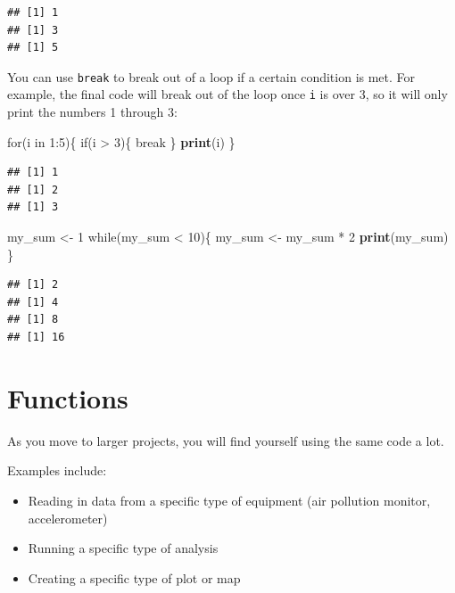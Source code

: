 \documentclass[]{book}
\makeatletter
\newenvironment{Shaded}{\begin{snugshade}}{\end{snugshade}}
\newcommand{\KeywordTok}[1]{\textcolor[rgb]{0.13,0.29,0.53}{\textbf{{#1}}}}
\newcommand{\DecValTok}[1]{\textcolor[rgb]{0.00,0.00,0.81}{{#1}}}
\newcommand{\StringTok}[1]{\textcolor[rgb]{0.31,0.60,0.02}{{#1}}}
\newcommand{\NormalTok}[1]{{#1}}
\providecommand{\tightlist}{%
  \setlength{\itemsep}{0pt}\setlength{\parskip}{0pt}}
\newenvironment{kframe}{%
\medskip{}
\setlength{\fboxsep}{.8em}
 \def\at@end@of@kframe{}%
 \ifinner\ifhmode%
  \def\at@end@of@kframe{\end{minipage}}%
  \begin{minipage}{\columnwidth}%
 \fi\fi%
 \def\FrameCommand##1{\hskip\@totalleftmargin \hskip-\fboxsep
 \colorbox{shadecolor}{##1}\hskip-\fboxsep
     \hskip-\linewidth \hskip-\@totalleftmargin \hskip\columnwidth}%
 \MakeFramed {\advance\hsize-\width
   \@totalleftmargin\z@ \linewidth\hsize
   \@setminipage}}%
 {\par\unskip\endMakeFramed%
 \at@end@of@kframe}
\renewenvironment{Shaded}{\begin{kframe}}{\end{kframe}}
\makeatother
\begin{document}
\begin{verbatim}
## [1] 1
## [1] 3
## [1] 5
\end{verbatim}

You can use \texttt{break} to break out of a loop if a certain condition
is met. For example, the final code will break out of the loop once
\texttt{i} is over 3, so it will only print the numbers 1 through 3:

\begin{Shaded}
\begin{Highlighting}[]
\NormalTok{for(i in }\DecValTok{1}\NormalTok{:}\DecValTok{5}\NormalTok{)\{}
  \NormalTok{if(i >}\StringTok{ }\DecValTok{3}\NormalTok{)\{}
    \NormalTok{break}
  \NormalTok{\}}
  \KeywordTok{print}\NormalTok{(i)}
\NormalTok{\}}
\end{Highlighting}
\end{Shaded}

\begin{verbatim}
## [1] 1
## [1] 2
## [1] 3
\end{verbatim}

\begin{Shaded}
\begin{Highlighting}[]
\NormalTok{my_sum <-}\StringTok{ }\DecValTok{1}
\NormalTok{while(my_sum <}\StringTok{ }\DecValTok{10}\NormalTok{)\{}
  \NormalTok{my_sum <-}\StringTok{ }\NormalTok{my_sum *}\StringTok{ }\DecValTok{2}
  \KeywordTok{print}\NormalTok{(my_sum)}
\NormalTok{\}}
\end{Highlighting}
\end{Shaded}

\begin{verbatim}
## [1] 2
## [1] 4
## [1] 8
## [1] 16
\end{verbatim}

\section{Functions}\label{functions}

As you move to larger projects, you will find yourself using the same
code a lot. \bigskip

Examples include:

\begin{itemize}
\tightlist
\item
  Reading in data from a specific type of equipment (air pollution
  monitor, accelerometer)
\item
  Running a specific type of analysis
\item
  Creating a specific type of plot or map
\end{itemize}
\end{document}
